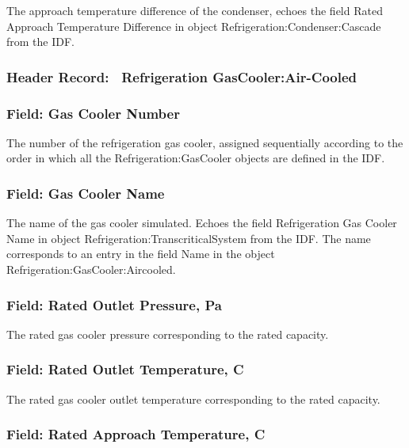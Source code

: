 The approach temperature difference of the condenser, echoes the field Rated Approach Temperature Difference in object Refrigeration:Condenser:Cascade from the IDF.

\subsubsection{Header Record:~ Refrigeration GasCooler:Air-Cooled}\label{header-record-refrigeration-gascoolerair-cooled}

\subsubsection{Field: Gas Cooler Number}\label{field-gas-cooler-number}

The number of the refrigeration gas cooler, assigned sequentially according to the order in which all the Refrigeration:GasCooler objects are defined in the IDF.

\subsubsection{Field: Gas Cooler Name}\label{field-gas-cooler-name}

The name of the gas cooler simulated. Echoes the field Refrigeration Gas Cooler Name in object Refrigeration:TranscriticalSystem from the IDF. The name corresponds to an entry in the field Name in the object Refrigeration:GasCooler:Aircooled.

\subsubsection{Field: Rated Outlet Pressure, Pa}\label{field-rated-outlet-pressure-pa}

The rated gas cooler pressure corresponding to the rated capacity.

\subsubsection{Field: Rated Outlet Temperature, C}\label{field-rated-outlet-temperature-c}

The rated gas cooler outlet temperature corresponding to the rated capacity.

\subsubsection{Field: Rated Approach Temperature, C}\label{field-rated-approach-temperature-c}

